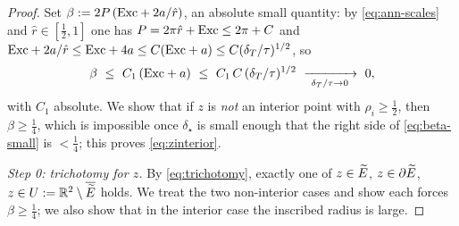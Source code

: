 \begin{proof}
Set $\beta:=2P\,(\mathrm{Exc}+2a/\hat r)$, an absolute small quantity: by
\eqref{eq:ann-scales} and $\hat r\in[\tfrac12,1]$ one has $P=2\pi\hat r+\mathrm{Exc}
\le2\pi+C$ and $\mathrm{Exc}+2a/\hat r\le\mathrm{Exc}+4a\le C(\mathrm{Exc}+a)\le C(\delta_T/\tau)^{1/2}$,
so
\begin{equation}\label{eq:beta-small}
   \beta\ \le\ C_1\,(\mathrm{Exc}+a)\ \le\ C_1\,C\,(\delta_T/\tau)^{1/2}
   \ \xrightarrow[\ \delta_T/\tau\to0\ ]{}\ 0,
\end{equation}
with $C_1$ absolute. We show that if $z$ is \emph{not} an interior point with
$\rho_i\ge\tfrac12$, then $\beta\ge\tfrac1{4}$, which is impossible once
$\delta_\star$ is small enough that the right side of \eqref{eq:beta-small} is
$<\tfrac14$; this proves \eqref{eq:zinterior}.

\emph{Step 0: trichotomy for $z$.} By \eqref{eq:trichotomy}, exactly one of
$z\in\widetilde{E}$, $z\in\partial\widetilde{E}$, $z\in U:=\mathbb{R}^2\setminus\overline{\widetilde{E}}$ holds.
We treat the two non-interior cases and show each forces $\beta\ge\tfrac14$;
we also show that in the interior case the inscribed radius is large.


\end{proof}
